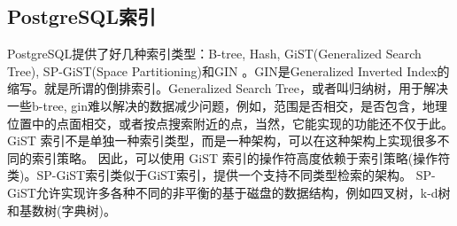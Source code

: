 \documentclass[../../../interview-questions.tex]{subfiles}
\begin{document}
\subsection{PostgreSQL索引}

PostgreSQL提供了好几种索引类型：B-tree, Hash, GiST(Generalized Search Tree), SP-GiST(Space Partitioning)和GIN 。GIN是Generalized Inverted Index的缩写。就是所谓的倒排索引。Generalized Search Tree，或者叫归纳树，用于解决一些b-tree, gin难以解决的数据减少问题，例如，范围是否相交，是否包含，地理位置中的点面相交，或者按点搜索附近的点，当然，它能实现的功能还不仅于此。GiST 索引不是单独一种索引类型，而是一种架构，可以在这种架构上实现很多不同的索引策略。 因此，可以使用 GiST 索引的操作符高度依赖于索引策略(操作符类)。SP-GiST索引类似于GiST索引，提供一个支持不同类型检索的架构。 SP-GiST允许实现许多各种不同的非平衡的基于磁盘的数据结构，例如四叉树，k-d树和基数树(字典树)。
\end{document}

